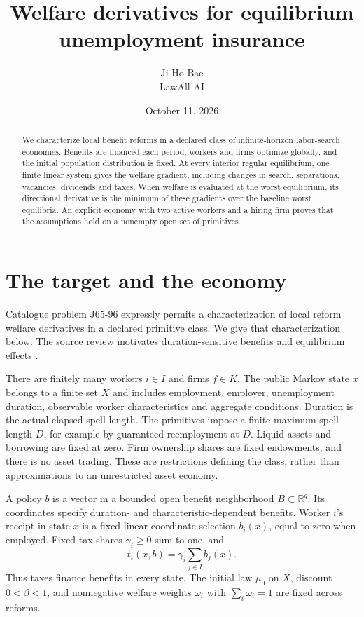 \documentclass[11pt]{article}
\title{Welfare derivatives for equilibrium unemployment insurance}
\author{Ji Ho Bae\\\small LawAll AI}
\date{October 11, 2026}
\newcommand{\R}{\mathbb R}
\begin{document}
\maketitle
\begin{abstract}
We characterize local benefit reforms in a declared class of infinite-horizon labor-search economies. Benefits are financed each period, workers and firms optimize globally, and the initial population distribution is fixed. At every interior regular equilibrium, one finite linear system gives the welfare gradient, including changes in search, separations, vacancies, dividends and taxes. When welfare is evaluated at the worst equilibrium, its directional derivative is the minimum of these gradients over the baseline worst equilibria. An explicit economy with two active workers and a hiring firm proves that the assumptions hold on a nonempty open set of primitives.
\end{abstract}

\section{The target and the economy}
Catalogue problem J65-96 expressly permits a characterization of local reform welfare derivatives in a declared primitive class. We give that characterization below. The source review motivates duration-sensitive benefits and equilibrium effects \cite[\S\S3.6.2, 3.7.1, 3.9]{ui}.

There are finitely many workers $i\in I$ and firms $f\in K$. The public Markov state $x$ belongs to a finite set $X$ and includes employment, employer, unemployment duration, observable worker characteristics and aggregate conditions. Duration is the actual elapsed spell length. The primitives impose a finite maximum spell length $D$, for example by guaranteed reemployment at $D$. Liquid assets and borrowing are fixed at zero. Firm ownership shares are fixed endowments, and there is no asset trading. These are restrictions defining the class, rather than approximations to an unrestricted asset economy.

A policy $b$ is a vector in a bounded open benefit neighborhood $B\subset\R^q$. Its coordinates specify duration- and characteristic-dependent benefits. Worker $i$'s receipt in state $x$ is a fixed linear coordinate selection $b_i(x)$, equal to zero when employed. Fixed tax shares $\gamma_i\ge0$ sum to one, and
\[
 t_i(x,b)=\gamma_i\sum_{j\in I}b_j(x).
\]
Thus taxes finance benefits in every state. The initial law $\mu_0$ on $X$, discount $0<\beta<1$, and nonnegative welfare weights $\omega_i$ with $\sum_i\omega_i=1$ are fixed across reforms.
\end{document}

